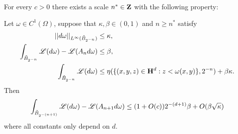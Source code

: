 \begin{lemma}\label{DGL1}
For every $c > 0$ there exists a scale $n^* \in \mathbf{Z}$ with the following property:

Let $\omega \in C^1(\Omega)$, suppose that $\kappa, \beta \in (0, 1)$ and $n \geq n^*$ satisfy
\begin{align}
||d\omega||_{L^\infty(\tilde B_{2^{-n}})} &\leq \kappa, \label{DGL1 1}\\
\int_{\tilde B_{2^{-n}}} \mathscr L(d\omega) - \mathscr L(A_n d\omega) &\leq \beta, \label{DGL1 2}\\
\int_{\tilde B_{2^{-n}}} \mathscr L(d\omega) &\leq \eta(\{(x, y, z) \in \mathbf H^d: z < \omega(x, y)\}, 2^{-n}) + \beta \kappa. \label{DGL1 3}
\end{align}
Then
$$\int_{\tilde B_{2^{-(n + 1)}}}\mathscr L(d\omega) - \mathscr L(A_{n + 1} d\omega) \leq (1 + O(c)) 2^{-(d + 1)} \beta + O(\beta \sqrt \kappa)$$
where all constants only depend on $d$.
\end{lemma}
